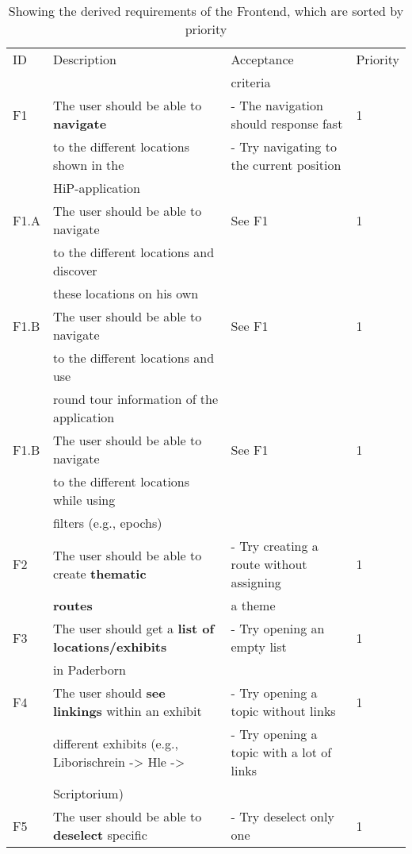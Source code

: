 \documentclass[twoside,openright,fleqn,pointlessnumbers,headinclude,,11pt,a4paper,BCOR5mm,footinclude,cleardoubleempty,abstracton %
                ]{scrreprt}
\begin{document}
	\begin{table}[h]
			\caption{Showing the derived requirements of the Frontend, which are sorted by priority}
	\centering%
	\begin{tabular}{llll}
			\hline
	ID 	& Description 	& Acceptance 	& Priority \\
	 	& 			 & criteria 	&  \\
	\hline
	F1 & The user should be able to \textbf{navigate} 			&  - The navigation should response fast  		& 1\\
	 	& to the different locations shown in the 				&  - Try navigating to the current position		& \\
		& HiP-application 								&		&	\\
	\hline
	F1.A & The user should be able to navigate 		&  See F1		& 1\\
	 	& to the different locations and discover 		&  		& \\
		& these locations on his own 				&		&	\\
	\hline
	F1.B & The user should be able to navigate 		&  See F1		& 1\\
	 	& to the different locations and use 		&  		& \\
		& round tour information of the application 	&		&	\\
		\hline
	F1.B & The user should be able to navigate 		& See F1	 	& 1\\
	 	& to the different locations while using  		&  		& \\
		& filters (e.g., epochs)					&		&	\\
	\hline
	F2 & The user should be able to create \textbf{thematic} 	& - Try creating a route without assigning & 1\\
		& \textbf{routes} 								& a theme & \\
	\hline
	F3 & The user should get a \textbf{list of locations/exhibits} 	& - Try opening an empty list  	& 1\\
		& in Paderborn									&	& \\
	\hline
	F4 & The user should \textbf{see linkings} within an exhibit  	&  - Try opening a topic without links	& 1\\
		& different exhibits (e.g., Liborischrein -> Hle ->		& - Try opening a topic with a lot of links	& \\
		& Scriptorium) 								&	& \\
	\hline
	F5 & The user should be able to \textbf{deselect} specific 	& - Try deselect only one & 1\\

\end{tabular}
\end{table}
\end{document}
